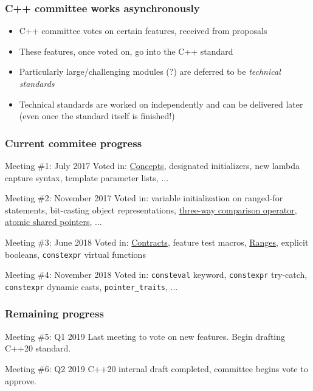 \documentclass{beamer}
\begin{document}

\begin{frame}
\frametitle{C++ committee works asynchronously}
\begin{itemize} \setlength\itemsep{2 em} %
\item C++ committee votes on certain features, received from proposals
\item These features, once voted on, go into the C++ standard
\item Particularly large/challenging modules (?) are deferred to be \emph{technical standards}
\item Technical standards are worked on independently and can be delivered later (even once the standard itself is finished!)
\end{itemize}
\end{frame}


\begin{frame}
\frametitle{Current commitee progress}
{ 
\begin{block}{Meeting \#1: July 2017}
Voted in: \underline{Concepts}, designated initializers, new lambda capture syntax, template parameter lists, ...
\end{block}

\begin{block}{Meeting \#2: November 2017}
Voted in: variable initialization on ranged-for statements, bit-casting object representations, \underline{three-way comparison operator}, \underline{atomic shared pointers}, ...
\end{block}

\begin{block}{Meeting \#3: June 2018}
Voted in: \underline{Contracts}, feature test macros, \underline{Ranges}, explicit booleans, \texttt{constexpr} virtual functions
\end{block}

\begin{block}{Meeting \#4: November 2018}
Voted in: \texttt{consteval} keyword, \texttt{constexpr} try-catch, \texttt{constexpr} dynamic casts, \texttt{pointer\_traits}, ...
\end{block}
}
\end{frame}

\begin{frame}
\frametitle{Remaining progress}
{ %
\begin{block}{Meeting \#5: Q1 2019}
Last meeting to vote on new features.
Begin drafting C++20 standard. 
\end{block}

\begin{block}{Meeting \#6: Q2 2019}
C++20 internal draft completed, committee begins vote to approve.
\end{block}
}
\end{frame}
\end{document}

